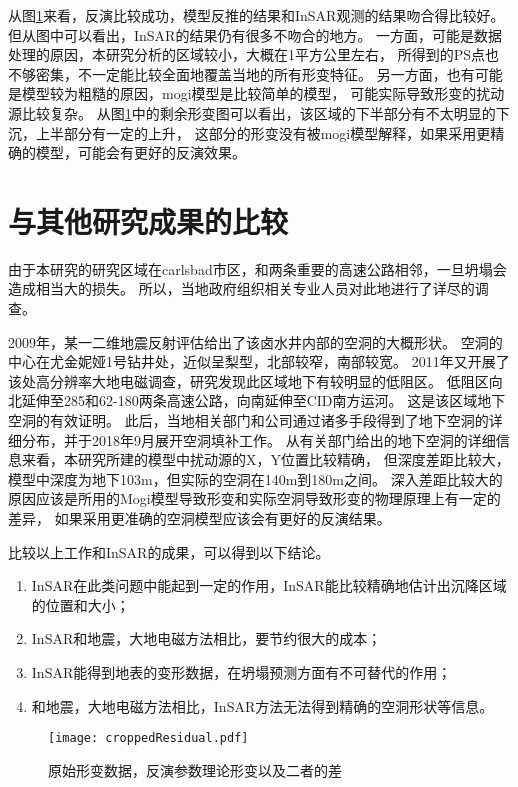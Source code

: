 从图\ref{fig:residual}来看，反演比较成功，模型反推的结果和InSAR观测的结果吻合得比较好。
但从图中可以看出，InSAR的结果仍有很多不吻合的地方。
一方面，可能是数据处理的原因，本研究分析的区域较小，大概在1平方公里左右，
所得到的PS点也不够密集，不一定能比较全面地覆盖当地的所有形变特征。
另一方面，也有可能是模型较为粗糙的原因，mogi模型是比较简单的模型，
可能实际导致形变的扰动源比较复杂。
从图\ref{fig:residual}中的剩余形变图可以看出，该区域的下半部分有不太明显的下沉，上半部分有一定的上升，
这部分的形变没有被mogi模型解释，如果采用更精确的模型，可能会有更好的反演效果。

\section{与其他研究成果的比较}
由于本研究的研究区域在carlsbad市区，和两条重要的高速公路相邻，一旦坍塌会造成相当大的损失。
所以，当地政府组织相关专业人员对此地进行了详尽的调查。

2009年，某一二维地震反射评估给出了该卤水井内部的空洞的大概形状。
空洞的中心在尤金妮娅1号钻井处，近似呈梨型，北部较窄，南部较宽。
2011年又开展了该处高分辨率大地电磁调查\cite{landElectricalResistivitySurvey2011}，研究发现此区域地下有较明显的低阻区。
低阻区向北延伸至285和62-180两条高速公路，向南延伸至CID南方运河。
这是该区域地下空洞的有效证明。
此后，当地相关部门和公司通过诸多手段得到了地下空洞的详细分布，并于2018年9月展开空洞填补工作。
从有关部门给出的地下空洞的详细信息来看，本研究所建的模型中扰动源的X，Y位置比较精确，
但深度差距比较大，模型中深度为地下103m，但实际的空洞在140m到180m之间。
深入差距比较大的原因应该是所用的Mogi模型导致形变和实际空洞导致形变的物理原理上有一定的差异，
如果采用更准确的空洞模型应该会有更好的反演结果。

比较以上工作和InSAR的成果，可以得到以下结论。
\begin{enumerate}
    \item InSAR在此类问题中能起到一定的作用，InSAR能比较精确地估计出沉降区域的位置和大小；
    \item InSAR和地震，大地电磁方法相比，要节约很大的成本；
    \item InSAR能得到地表的变形数据，在坍塌预测方面有不可替代的作用；
    \item 和地震，大地电磁方法相比，InSAR方法无法得到精确的空洞形状等信息。
\end{enumerate}

\begin{landscape}
\begin{figure}[htb]
    \centering
    \texttt{[image: croppedResidual.pdf]}
    \caption{原始形变数据，反演参数理论形变以及二者的差}
    \label{fig:residual}
\end{figure}
\end{landscape}